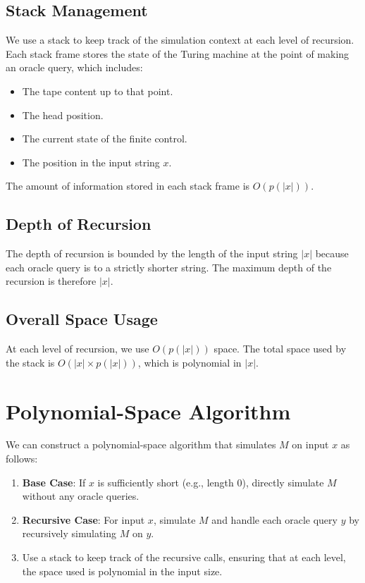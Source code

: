 \documentclass{article}
\begin{document}
\subsection*{Stack Management}

We use a stack to keep track of the simulation context at each level of recursion. Each stack frame stores the state of the Turing machine at the point of making an oracle query, which includes:
\begin{itemize}
    \item The tape content up to that point.
    \item The head position.
    \item The current state of the finite control.
    \item The position in the input string \( x \).
\end{itemize}
The amount of information stored in each stack frame is \( O(p(|x|)) \).

\subsection*{Depth of Recursion}

The depth of recursion is bounded by the length of the input string \( |x| \) because each oracle query is to a strictly shorter string. The maximum depth of the recursion is therefore \( |x| \).

\subsection*{Overall Space Usage}

At each level of recursion, we use \( O(p(|x|)) \) space. The total space used by the stack is \( O(|x| \times p(|x|)) \), which is polynomial in \( |x| \).

\section*{Polynomial-Space Algorithm}

We can construct a polynomial-space algorithm that simulates \( M \) on input \( x \) as follows:

\begin{enumerate}
    \item \textbf{Base Case}: If \( x \) is sufficiently short (e.g., length 0), directly simulate \( M \) without any oracle queries.
    \item \textbf{Recursive Case}: For input \( x \), simulate \( M \) and handle each oracle query \( y \) by recursively simulating \( M \) on \( y \).
    \item Use a stack to keep track of the recursive calls, ensuring that at each level, the space used is polynomial in the input size.
\end{enumerate}
\end{document}
